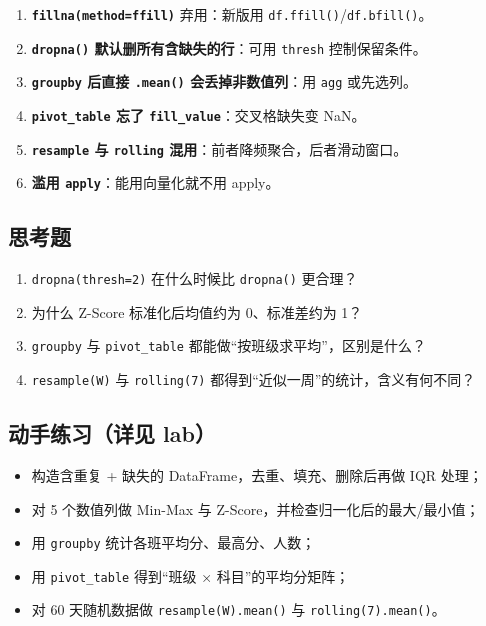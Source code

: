 \begin{enumerate}
\def\labelenumi{\arabic{enumi}.}
\tightlist
\item
  \textbf{\texttt{fillna(method=\textquotesingle{}ffill\textquotesingle{})}}
  弃用：新版用 \texttt{df.ffill()}/\texttt{df.bfill()}。
\item
  \textbf{\texttt{dropna()} 默认删所有含缺失的行}：可用 \texttt{thresh}
  控制保留条件。
\item
  \textbf{\texttt{groupby} 后直接 \texttt{.mean()} 会丢掉非数值列}：用
  \texttt{agg} 或先选列。
\item
  \textbf{\texttt{pivot\_table} 忘了 \texttt{fill\_value}}：交叉格缺失变
  NaN。
\item
  \textbf{\texttt{resample} 与 \texttt{rolling}
  混用}：前者降频聚合，后者滑动窗口。
\item
  \textbf{滥用 \texttt{apply}}：能用向量化就不用 apply。
\end{enumerate}

\subsection{思考题}\label{ux601dux8003ux9898-15}

\begin{enumerate}
\def\labelenumi{\arabic{enumi}.}
\tightlist
\item
  \texttt{dropna(thresh=2)} 在什么时候比 \texttt{dropna()} 更合理？
\item
  为什么 Z-Score 标准化后均值约为 0、标准差约为 1？
\item
  \texttt{groupby} 与 \texttt{pivot\_table}
  都能做``按班级求平均''，区别是什么？
\item
  \texttt{resample(\textquotesingle{}W\textquotesingle{})} 与
  \texttt{rolling(7)} 都得到``近似一周''的统计，含义有何不同？
\end{enumerate}

\subsection{动手练习（详见
lab）}\label{ux52a8ux624bux7ec3ux4e60ux8be6ux89c1-lab-7}

\begin{itemize}
\tightlist
\item
  构造含重复 + 缺失的 DataFrame，去重、填充、删除后再做 IQR 处理；
\item
  对 5 个数值列做 Min-Max 与 Z-Score，并检查归一化后的最大/最小值；
\item
  用 \texttt{groupby} 统计各班平均分、最高分、人数；
\item
  用 \texttt{pivot\_table} 得到``班级 × 科目''的平均分矩阵；
\item
  对 60 天随机数据做
  \texttt{resample(\textquotesingle{}W\textquotesingle{}).mean()} 与
  \texttt{rolling(7).mean()}。
\end{itemize}

